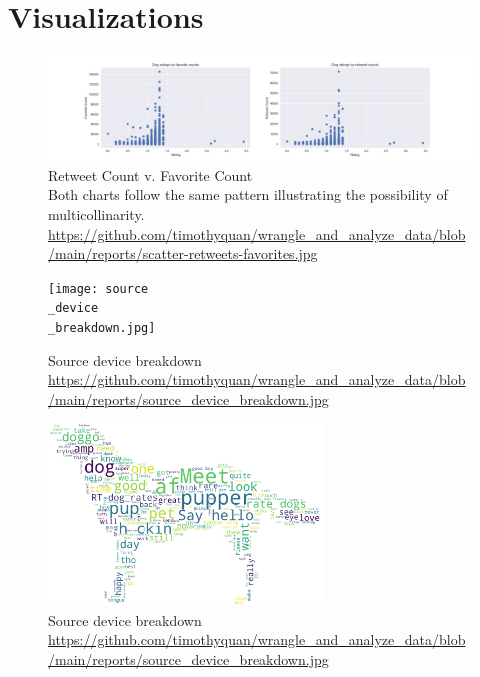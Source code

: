 \documentclass[10pt,a4paper]{article}
\begin{document}
    \section{Visualizations}
        \begin{figure}[htb]
            \centering
            \includegraphics[width=1\textwidth]{scatter-retweets-favorites.jpg}            
            \caption{Retweet Count v. Favorite Count \\ Both charts follow the same pattern illustrating the possibility of
            multicollinarity.\\\url{https://github.com/timothyquan/wrangle_and_analyze_data/blob/main/reports/scatter-retweets-favorites.jpg} }            
        \end{figure}
        \begin{figure}[htb]
            \centering
            \texttt{[image: source\\\_device\\\_breakdown.jpg]}      
            \caption{Source device breakdown \\\url{https://github.com/timothyquan/wrangle_and_analyze_data/blob/main/reports/source_device_breakdown.jpg} }            
        \end{figure}
        \begin{figure}[htb]
            \centering
            \includegraphics[width=0.65\textwidth]{dogcloud.jpg}      
            \caption{Source device breakdown \\\url{https://github.com/timothyquan/wrangle_and_analyze_data/blob/main/reports/source_device_breakdown.jpg} }            
        \end{figure}
\end{document}
